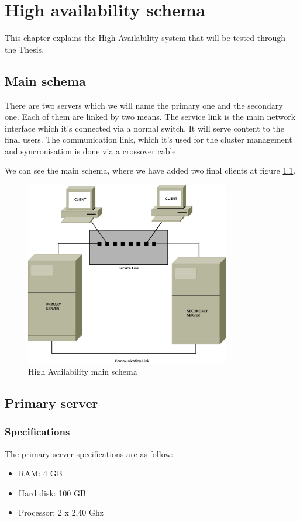 

\chapter{High availability schema}
\label{chap:ha-schema}
This chapter explains the High Availability system that will be tested through the Thesis. 

\section {Main schema}
There are two servers which we will name the primary one and the secondary one. Each of them are linked by two means. The service link is the main network interface which it's connected via a normal switch. It will serve content to the final users. The communication link, which it's used for the cluster management and syncronisation is done via a crossover cable.

We can see the main schema, where we have added two final clients at figure \ref{fig:main-schema}.

\begin{figure}
  \centering
    \includegraphics[width=0.8\textwidth]{img/ha_main_schema.eps}
  \caption{High Availability main schema}
  \label{fig:main-schema}
\end{figure}

\section {Primary server}
\subsection {Specifications}
The primary server specifications are as follow:
\begin{itemize}
  \item RAM: 4 GB
  \item Hard disk: 100 GB
  \item Processor: 2 x 2,40 Ghz
\end{itemize}

